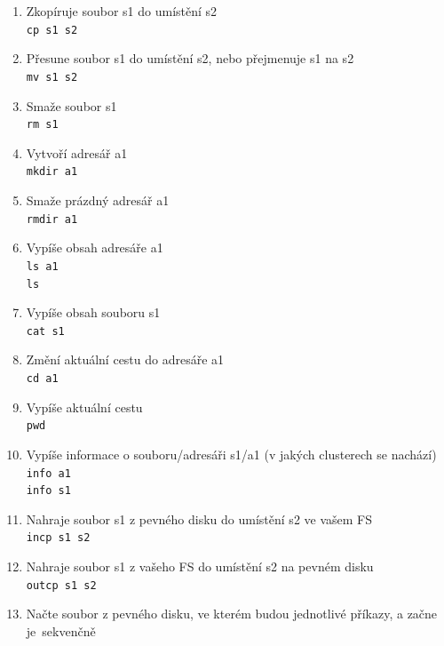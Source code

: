 \documentclass[12pt]{report}
\begin{document}
	\begin{enumerate}
		\item Zkopíruje soubor s1 do umístění s2
		\\ \texttt{cp s1 s2}
		\\
		\item Přesune soubor s1 do umístění s2, nebo přejmenuje s1 na s2
		\\ \texttt{mv s1 s2}
		\\
		\item Smaže soubor s1
		\\ \texttt{rm s1}
		\\
		\item Vytvoří adresář a1
		\\ \texttt{mkdir a1}
		\\
		\item Smaže prázdný adresář a1
		\\ \texttt{rmdir a1}
		\\
		\item Vypíše obsah adresáře a1
		\\ \texttt{ls a1}
		\\ \texttt{ls}
		\\
		\item Vypíše obsah souboru s1
		\\ \texttt{cat s1}
		\\
		\item Změní aktuální cestu do adresáře a1
		\\ \texttt{cd a1}
		\\
		\item Vypíše aktuální cestu
		\\ \texttt{pwd}
		\\
		\item Vypíše informace o souboru/adresáři s1/a1 (v jakých clusterech se nachází)
		\\ \texttt{info a1}
		\\ \texttt{info s1}
		\\
		\item Nahraje soubor s1 z pevného disku do umístění s2 ve vašem FS
		\\ \texttt{incp s1 s2}
		\\
		\item Nahraje soubor s1 z vašeho FS do umístění s2 na pevném disku
		\\ \texttt{outcp s1 s2}
		\\
		\item Načte soubor z pevného disku, ve kterém budou jednotlivé příkazy, a začne je~sekvenčně

\end{enumerate}
\end{document}
